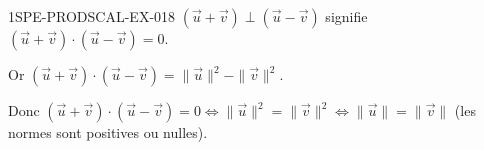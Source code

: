\begin{corrige}{1SPE-PRODSCAL-EX-018}
$(\vec{u} + \vec{v}) \perp (\vec{u} - \vec{v})$ signifie $(\vec{u} + \vec{v}) \cdot (\vec{u} - \vec{v}) = 0$.

Or $(\vec{u} + \vec{v}) \cdot (\vec{u} - \vec{v}) = \|\vec{u}\|^2 - \|\vec{v}\|^2$.

Donc $(\vec{u} + \vec{v}) \cdot (\vec{u} - \vec{v}) = 0 \iff \|\vec{u}\|^2 = \|\vec{v}\|^2 \iff \|\vec{u}\| = \|\vec{v}\|$ (les normes sont positives ou nulles).
\end{corrige}
